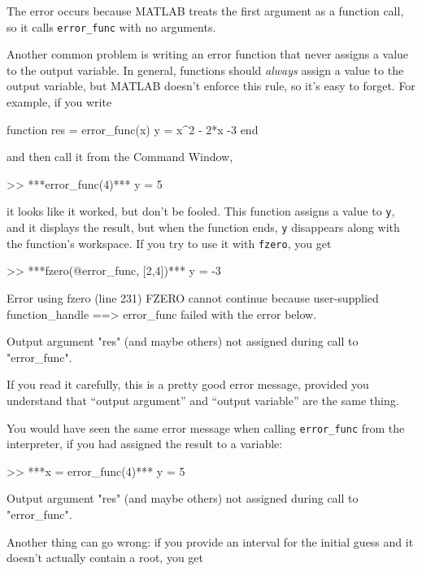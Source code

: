 The error occurs because MATLAB treats the first argument as a function call, so it calls \lstinline{error_func} with no arguments.


Another common problem is writing an error function that never
assigns a value to the output variable.  In general, functions should
\emph{always} assign a value to the output variable, but MATLAB doesn't
enforce this rule, so it's easy to forget.  
\newpage
For example, if you
write

\begin{code}
function res = error_func(x)
    y = x^2 - 2*x -3
end
\end{code}
and then call it from the Command Window,
\begin{code}
>> ***error_func(4)***
y = 5
\end{code}
it looks like it worked, but don't be fooled.  This function assigns
a value to \lstinline{y}, and it displays the result, but when the function
ends, \lstinline{y} disappears along with the function's workspace.
If you try to use it with \lstinline{fzero}, you get

\begin{code}
>> ***fzero(@error_func, [2,4])***
y = -3

Error using fzero (line 231)
FZERO cannot continue because user-supplied function_handle ==>
error_func failed with the error below.

Output argument "res" (and maybe others) not assigned during call
to "error_func".
\end{code}

If you read it carefully, this is a pretty good error message,
provided you understand that ``output argument'' and ``output variable'' are the same thing.


You would have seen the same error message when calling \lstinline{error_func} from the interpreter, if you had assigned the result to a variable:

\begin{code}
>> ***x = error_func(4)***
y = 5

Output argument "res" (and maybe others) not assigned during
call to "error_func".
\end{code}

Another thing can go wrong: if you provide an interval for the
initial guess and it doesn't actually contain a root, you get

